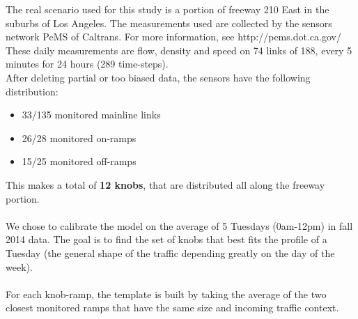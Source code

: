 The real scenario used for this study is a portion of freeway 210 East in the suburbs of Los Angeles. The measurements used are collected by the sensors network PeMS of Caltrans. For more information, see http://pems.dot.ca.gov/\\
These daily measurements are flow, density and speed on 74 links of 188, every 5 minutes for 24 hours (289 time-steps).\\
After deleting partial or too biased data, the sensors have the following distribution:
\begin{itemize}
	\item 33/135 monitored mainline links
	\item 26/28 monitored on-ramps
	\item 15/25 monitored off-ramps
\end{itemize}
This makes a total of \textbf{12 knobs}, that are distributed all along the freeway portion.\\
\\
We chose to calibrate the model on the average of 5 Tuesdays (0am-12pm) in fall 2014 data. The goal is to find the set of knobs that best fits the profile of a Tuesday (the general shape of the traffic depending greatly on the day of the week).\\
\\
For each knob-ramp, the template is built by taking the average of the two closest monitored ramps that have the same size and incoming traffic context. 